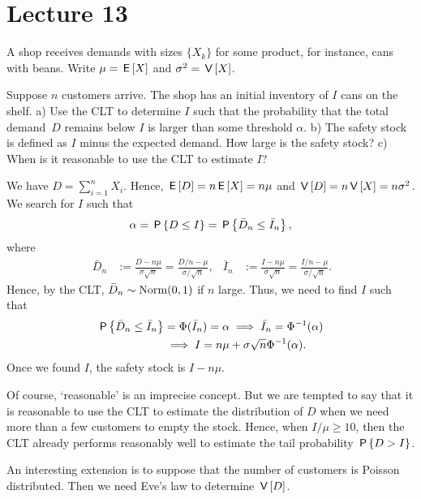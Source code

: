 \documentclass[lectures]{subfiles}
\begin{document}
\section{Lecture 13}
\label{sec:lecture-13}



\begin{exercise}
A shop receives demands with sizes $\{X_{k}\}$ for some product, for instance, cans with beans.
Write $\mu = \E X$ and $\sigma^{2} = \V X$.

Suppose $n$ customers arrive.
The shop has an initial inventory of $I$ cans on the shelf.
a) Use the CLT to determine $I$ such that the probability that the total demand~$D$ remains below $I$ is larger than some threshold $\alpha$.
b) The safety stock is defined as $I$ minus the expected demand.
How large is the safety stock?
c) When is it reasonable to use the CLT to estimate $I$?
\begin{solution}
We have $D=\sum_{i=1}^{n} X_{i}$. Hence, $\E D = n \E X = n \mu$ and $\V D = n \V X = n \sigma^{2}$. We search for $I$ such that
\begin{equation}
  \label{eq:131}
\alpha = \P{D \leq I}   = \P{\bar D_n \leq \bar I_{n}},
\end{equation}
where
\begin{align}
  \label{eq:132}\
\bar D_{n} &:= \frac{D-n\mu}{\sigma \sqrt n}   = \frac{D/n - \mu}{\sigma/\sqrt n}, &
\bar I_{n} &:= \frac{I-n\mu}{\sigma \sqrt n}   = \frac{I/n - \mu}{\sigma/\sqrt n}.
\end{align}
Hence, by the CLT, $\bar D_{n}\sim \Norm{0, 1}$ if $n$ large. Thus, we need to find $I$ such that
\begin{align}
\P{\bar D_{n} \leq \bar I_{n}} &= \Phi(\bar I_{n}) = \alpha \implies \bar I_{n} = \Phi^{-1}(\alpha) \\
&\implies  I = n\mu + \sigma \sqrt n \Phi^{-1}(\alpha).
\end{align}
Once we found $I$, the safety stock is $I-n\mu$.

Of course, `reasonable' is an imprecise concept.
But we are tempted to say that it is reasonable to use the CLT to estimate the distribution of $D$ when we need more than a few customers to empty the stock.
Hence, when $I/\mu \geq 10$, then the CLT already performs reasonably well to estimate the tail probability $\P{D>I}$.

An interesting extension is to suppose that the number of customers is Poisson distributed. Then we need Eve's law to determine $\V D$.

\end{solution}
\end{exercise}
\end{document}
